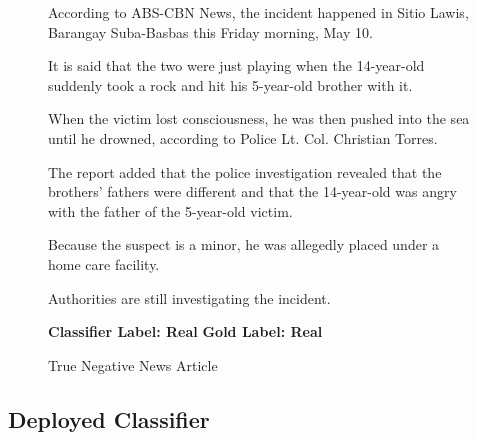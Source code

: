 \begin{figure}[h!]
{{                          \small \raggedright According to ABS-CBN News, the incident happened in Sitio Lawis, Barangay Suba-Basbas this Friday morning, May 10.\linebreak

                          \small \raggedright It is said that the two were just playing when the 14-year-old suddenly took a rock and hit his 5-year-old brother with it.\linebreak

                          \small \raggedright When the victim lost consciousness, he was then pushed into the sea until he drowned, according to Police Lt. Col. Christian Torres.\linebreak

                          \small \raggedright The report added that the police investigation revealed that the brothers' fathers were different and that the 14-year-old was angry with the father of the 5-year-old victim.\linebreak

                          \small \raggedright Because the suspect is a minor, he was allegedly placed under a home care facility.\linebreak

                          \small \raggedright Authorities are still investigating the incident.\linebreak
                            \linebreak\linebreak

                            \textbf{Classifier Label: Real} \newline
                            \textbf{Gold Label: Real}

                        }
                      }
                         \caption{True Negative News Article}
                            \label{fig:true-negative-news-article}
                        \end{figure}
\clearpage
\pagebreak

\subsection{Deployed Classifier}

